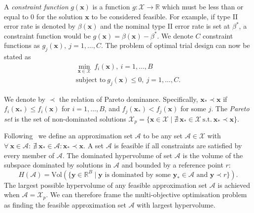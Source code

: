\documentclass{article} %
\begin{document}
A \emph{constraint function} $g(\mathbf{x})$ is a function $g : \mathcal{X} \rightarrow \mathbb{R}$ which must be less than or equal to 0 for the solution $\mathbf{x}$ to be considered feasible. For example, if type II error rate is denoted by $\beta(\mathbf{x})$ and the nominal type II error rate is set at $\beta^{*}$, a constraint function would be $g(\mathbf{x}) = \beta(\mathbf{x}) - \beta^{*}$. We denote $C$ constraint functions as $g_{j}(\mathbf{x}),~j=1,\ldots , C$. The problem of optimal trial design can now be stated as
\begin{align}
\min_{\mathbf{x} \in \mathcal{X}} {~ f_{i}(\mathbf{x})}, ~ i = 1, \ldots , B \\
\text{subject to} ~ g_{j}(\mathbf{x}) \leq 0, ~ j = 1, \ldots , C.
\end{align}

We denote by $\prec$ the relation of Pareto dominance. Specifically, $\mathbf{x}_{*} \prec \mathbf{x}$ if $f_{i}(\mathbf{x}_{*}) \leq f_{i}(\mathbf{x})$ for $i = 1, \ldots , B$, and $f_{j}(\mathbf{x}_{*}) < f_{j}(\mathbf{x})$ for some $j$. The \emph{Pareto set} is the set of non-dominated solutions 
$\mathcal{X}_{p} = \{\mathbf{x} \in \mathcal{X} \mid \nexists ~ \mathbf{x}_{*}  \in \mathcal{X} ~\text{s.t.}~ \mathbf{x}_{*} \prec \mathbf{x} \}$. 

Following~\cite{Emmerich2011} we define an approximation set $\mathcal{A}$ to be any set $\mathcal{A} \in \mathcal{X}$ with $\forall~\mathbf{x} \in \mathcal{A}:~\nexists~\mathbf{x}_{*} \in \mathcal{A} : \mathbf{x}_{*} \prec \mathbf{x}$. A set $\mathcal{A}$ is feasible if all constraints are satisfied by every member of $\mathcal{A}$. The dominated hypervolume of set $\mathcal{A}$ is the volume of the subspace dominated by solutions in $\mathcal{A}$ and bounded by a reference point $r$:
\begin{equation}
H(\mathcal{A}) = \text{Vol}(\{\mathbf{y} \in \mathbb{R}^{B} \mid \mathbf{y} \text{ is dominated by some } \mathbf{y}_{*} \in \mathcal{A} \text{ and } \mathbf{y} \prec r \}). 
\end{equation}
The largest possible hypervolume of any feasible approximation set $\mathcal{A}$ is achieved when $\mathcal{A} = \mathcal{X}_{p}$. We can therefore frame the multi-objective optimisation problem as finding the feasible approximation set $\mathcal{A}$ with largest hypervolume.
\end{document}
